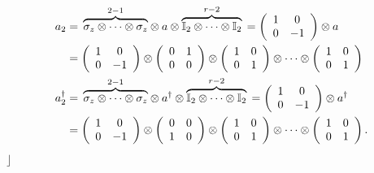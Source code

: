 \documentclass[aps,preprint]{revtex4}%
\begin{document}
\begin{align}
a_{2}  &  =\,\overset{2-1}{\overbrace{\mathbb{\sigma}_{z}\otimes\cdots
\otimes\mathbb{\sigma}_{z}}}\otimes a\otimes
\overset{r-2}{\overbrace{\mathbb{I}_{2}\otimes\cdots\otimes\mathbb{I}_{2}}%
}\,=\left(
\begin{array}
[c]{cc}%
1 & 0\\
0 & -1
\end{array}
\right)  \otimes a\\
&  =\left(
\begin{array}
[c]{cc}%
1 & 0\\
0 & -1
\end{array}
\right)  \otimes\left(
\begin{array}
[c]{cc}%
0 & 1\\
0 & 0
\end{array}
\right)  \otimes\left(
\begin{array}
[c]{cc}%
1 & 0\\
0 & 1
\end{array}
\right)  \otimes\cdots\otimes\left(
\begin{array}
[c]{cc}%
1 & 0\\
0 & 1
\end{array}
\right) \\
a_{2}^{\dagger}  &  =\,\overset{2-1}{\overbrace{\mathbb{\sigma}_{z}%
\otimes\cdots\otimes\mathbb{\sigma}_{z}}}\otimes a^{\dagger}\otimes
\overset{r-2}{\overbrace{\mathbb{I}_{2}\otimes\cdots\otimes\mathbb{I}_{2}}%
}\,=\left(
\begin{array}
[c]{cc}%
1 & 0\\
0 & -1
\end{array}
\right)  \otimes a^{\dagger}\\
&  =\left(
\begin{array}
[c]{cc}%
1 & 0\\
0 & -1
\end{array}
\right)  \otimes\left(
\begin{array}
[c]{cc}%
0 & 0\\
1 & 0
\end{array}
\right)  \otimes\left(
\begin{array}
[c]{cc}%
1 & 0\\
0 & 1
\end{array}
\right)  \otimes\cdots\otimes\left(
\begin{array}
[c]{cc}%
1 & 0\\
0 & 1
\end{array}
\right)  .
\end{align}
$\rfloor$
\end{document}
